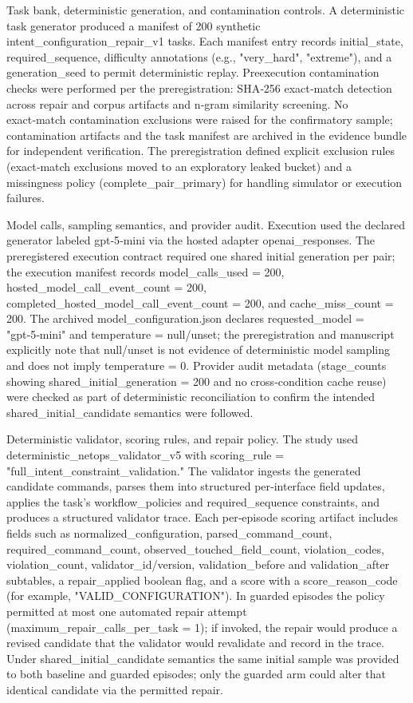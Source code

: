 \documentclass[conference]{IEEEtran}
\begin{document}
Task bank, deterministic generation, and contamination controls. A deterministic task generator produced a manifest of 200 synthetic intent\_configuration\_repair\_v1 tasks. Each manifest entry records initial\_state, required\_sequence, difficulty annotations (e.g., "very\_hard", "extreme"), and a generation\_seed to permit deterministic replay. Preexecution contamination checks were performed per the preregistration: SHA‑256 exact‑match detection across repair and corpus artifacts and n‑gram similarity screening. No exact‑match contamination exclusions were raised for the confirmatory sample; contamination artifacts and the task manifest are archived in the evidence bundle for independent verification. The preregistration defined explicit exclusion rules (exact‑match exclusions moved to an exploratory leaked bucket) and a missingness policy (complete\_pair\_primary) for handling simulator or execution failures.

Model calls, sampling semantics, and provider audit. Execution used the declared generator labeled gpt‑5‑mini via the hosted adapter openai\_responses. The preregistered execution contract required one shared initial generation per pair; the execution manifest records model\_calls\_used = 200, hosted\_model\_call\_event\_count = 200, completed\_hosted\_model\_call\_event\_count = 200, and cache\_miss\_count = 200. The archived model\_configuration.json declares requested\_model = "gpt‑5‑mini" and temperature = null/unset; the preregistration and manuscript explicitly note that null/unset is not evidence of deterministic model sampling and does not imply temperature = 0. Provider audit metadata (stage\_counts showing shared\_initial\_generation = 200 and no cross‑condition cache reuse) were checked as part of deterministic reconciliation to confirm the intended shared\_initial\_candidate semantics were followed.

Deterministic validator, scoring rules, and repair policy. The study used deterministic\_netops\_validator\_v5 with scoring\_rule = "full\_intent\_constraint\_validation." The validator ingests the generated candidate commands, parses them into structured per‑interface field updates, applies the task's workflow\_policies and required\_sequence constraints, and produces a structured validator trace. Each per‑episode scoring artifact includes fields such as normalized\_configuration, parsed\_command\_count, required\_command\_count, observed\_touched\_field\_count, violation\_codes, violation\_count, validator\_id/version, validation\_before and validation\_after subtables, a repair\_applied boolean flag, and a score with a score\_reason\_code (for example, "VALID\_CONFIGURATION"). In guarded episodes the policy permitted at most one automated repair attempt (maximum\_repair\_calls\_per\_task = 1); if invoked, the repair would produce a revised candidate that the validator would revalidate and record in the trace. Under shared\_initial\_candidate semantics the same initial sample was provided to both baseline and guarded episodes; only the guarded arm could alter that identical candidate via the permitted repair.
\end{document}
